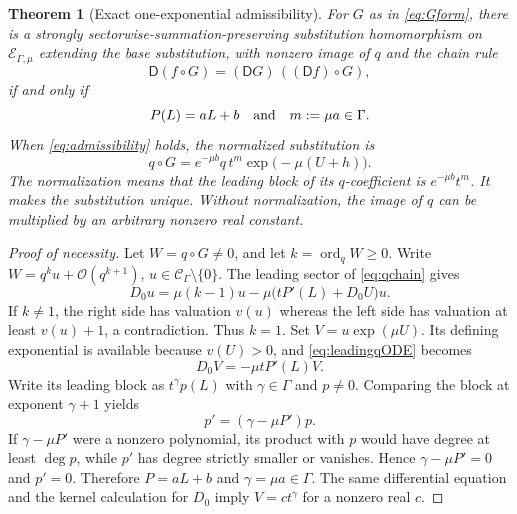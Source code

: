 \documentclass[11pt,a4paper]{article}
\newtheorem{theorem}{Theorem}[section]
\theoremstyle{definition}
\theoremstyle{remark}
\newcommand{\C}{\mathcal C_\Gamma}
\newcommand{\E}{\mathcal E_{\Gamma,\mu}}
\newcommand{\ordq}{\operatorname{ord}_q}
\newcommand{\OO}{\mathcal O}
\newcommand{\D}{\mathsf D}
\begin{document}
\begin{theorem}[Exact one-exponential admissibility]\label{thm:admissible}
For $G$ as in \eqref{eq:Gform}, there is a strongly
sectorwise-summation-preserving substitution homomorphism on $\E$ extending
the base substitution, with nonzero image of $q$ and the chain rule
\[
 \D(f\circ G)=(\D G)\,((\D f)\circ G),
\]
if and only if
\begin{equation}\label{eq:admissibility}
 P(L)=aL+b\quad\hbox{and}\quad m:=\mu a\in\Gamma.
\end{equation}
When \eqref{eq:admissibility} holds, the normalized substitution is
\begin{equation}\label{eq:qsub}
 q\circ G=e^{-\mu b}q\,t^m\exp\bigl(-\mu(U+h)\bigr).
\end{equation}
The normalization means that the leading block of its $q$-coefficient is
$e^{-\mu b}t^m$. It makes the substitution unique. Without normalization,
the image of $q$ can be multiplied by an arbitrary nonzero real constant.
\end{theorem}
\begin{proof}[Proof of necessity]
Let $W=q\circ G\ne0$, and let $k=\ordq W\ge0$. Write
$W=q^k u+\OO(q^{k+1})$, $u\in\C\setminus\{0\}$. The leading sector of
\eqref{eq:qchain} gives
\begin{equation}\label{eq:leadingqODE}
 D_0u=\mu(k-1)u-\mu\bigl(tP'(L)+D_0U\bigr)u.
\end{equation}
If $k\ne1$, the right side has valuation $v(u)$ whereas the left side has
valuation at least $v(u)+1$, a contradiction. Thus $k=1$.
Set $V=u\exp(\mu U)$. Its defining exponential is available because
$v(U)>0$, and \eqref{eq:leadingqODE} becomes
\[
 D_0V=-\mu tP'(L)V.
\]
Write its leading block as $t^\gamma p(L)$ with $\gamma\in\Gamma$ and
$p\ne0$. Comparing the block at exponent $\gamma+1$ yields
\begin{equation}\label{eq:polyobstruction}
 p'=(\gamma-\mu P')p.
\end{equation}
If $\gamma-\mu P'$ were a nonzero polynomial, its product with $p$ would
have degree at least $\deg p$, while $p'$ has degree strictly smaller or
vanishes. Hence $\gamma-\mu P'=0$ and $p'=0$. Therefore $P=aL+b$ and
$\gamma=\mu a\in\Gamma$. The same differential equation and the kernel
calculation for $D_0$ imply $V=ct^\gamma$ for a nonzero real $c$.
\end{proof}
\end{document}
